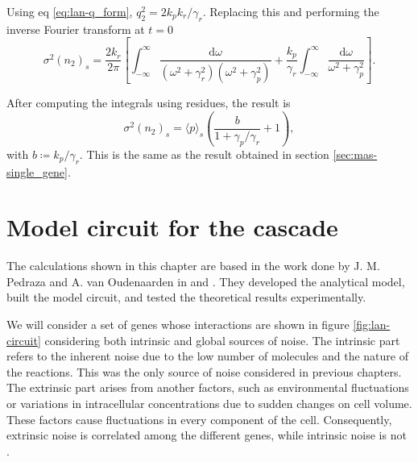 Using eq \eqref{eq:lan-q_form}, $q_2^2 = 2k_pk_r/\gamma_r$. Replacing this and performing the inverse Fourier transform at $t=0$
\begin{equation*}
  \sigma^2(n_2)_s = \frac{2k_r}{2\pi}\left[\int_{-\infty}^\infty\frac{\mathrm{d}\omega}{(\omega^2+\gamma_r^2)(\omega^2+\gamma_p^2)} + \frac{k_p}{\gamma_r}\int_{-\infty}^\infty \frac{\mathrm{d}\omega}{\omega^2+\gamma_p^2} \right].
\end{equation*}

After computing the integrals using residues, the result is
\begin{equation}
  \label{eq:lan-simple_varp}
  \sigma^2(n_2)_s = \langle p\rangle_s\left(\frac{b}{1+\gamma_p/\gamma_r}+1\right),
\end{equation}
with $b\coloneqq k_p/\gamma_r$. This is the same as the result obtained in section \ref{sec:mas-single_gene}.

\section{Model circuit for the cascade}

The calculations shown in this chapter are based in the work done by J. M. Pedraza and A. van Oudenaarden in \cite{pedraza05} and \cite{pedraza06}. They developed the analytical model, built the model circuit, and tested the theoretical results experimentally.

We will consider a set of genes whose interactions are shown in figure \ref{fig:lan-circuit} considering both intrinsic and global sources of noise. The intrinsic part refers to the inherent noise due to the low number of molecules and the nature of the reactions. This was the only source of noise considered in previous chapters. The extrinsic part arises from another factors, such as environmental fluctuations or variations in intracellular concentrations due to sudden changes on cell volume. These factors cause fluctuations in every component of the cell. Consequently, extrinsic noise is correlated among the different genes, while intrinsic noise is not \cite{elowitz02}.

